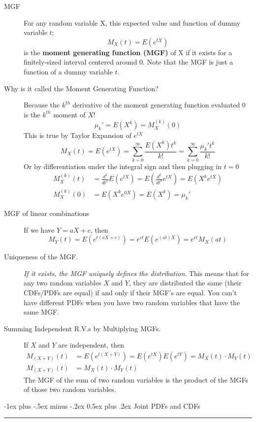 \documentclass[10pt,landscape]{article}
\makeatletter
\theoremstyle{definition}
\renewcommand{\section}{\@startsection{section}{1}{0mm}%
                                {-1ex plus -.5ex minus -.2ex}%
                                {0.5ex plus .2ex}%
                                {\normalfont\large\bfseries}}
\makeatother
\begin{document}
\begin{multicols}{3}
\begin{description}
    \item[MGF] For any random variable X, this expected value and function of dummy variable $t$;
        \[ M_X(t) = E(e^{tX}) \]
        is the \textbf{moment generating function (MGF)} of X if it exists for a finitely-sized interval centered around 0. Note that the MGF is just a function of a dummy variable $t$.
    \item[Why is it called the Moment Generating Function?] Because the $k^{th}$ derivative of the moment generating function evaluated 0 is the $k^{th}$ moment of $X$!
    \[\mu_k' = E(X^k) = M_X^{(k)}(0)\]
    This is true by Taylor Expansion of $e^{tX}$
    \[M_X(t) = E(e^{tX}) = \sum_{k=0}^\infty \frac{E(X^k)t^k}{k!} = \sum_{k=0}^\infty \frac{\mu_k't^k}{k!} \]
    Or by differentiation under the integral sign and then plugging in $t=0$
    \begin{align*}
        M_X^{(k)}(t) &= \frac{d^k}{dt^k}E(e^{tX}) = E(\frac{d^k}{dt^k}e^{tX}) = E(X^ke^{tX}) \\
        M_X^{(k)}(0) &= E(X^ke^{0X}) = E(X^k) = \mu_k'
    \end{align*}
    
    \item[MGF of linear combinations] If we have $Y = aX + c$, then
        \[M_Y(t) = E(e^{t(aX + c)}) =  e^{ct}E(e^{(at)X}) = e^{ct}M_X(at)\]
        
        
    \item[Uniqueness of the MGF.] \emph{If it exists, the MGF uniquely defines the distribution}. This means that for any two random variables $X$ and $Y$, they are distributed the same (their CDFs/PDFs are equal) if and only if their MGF's are equal. You can't have different PDFs when you have two random variables that have the same MGF.
    \item[Summing Independent R.V.s by Multiplying MGFs.] If $X$ and $Y$ are independent, then
    \begin{align*}
        M_{(X+Y)}(t) &= E(e^{t(X + Y)}) = E(e^{tX})E(e^{tY}) = M_X(t) \cdot M_Y(t) \\
        M_{(X+Y)}(t) &= M_X(t) \cdot M_Y(t)
    \end{align*}
    The MGF of the sum of two random variables is the product of the MGFs of those two random variables.
\end{description}

\section{Joint PDFs and CDFs}\smallskip \hrule height 2pt \smallskip


\end{multicols}
\end{document}

